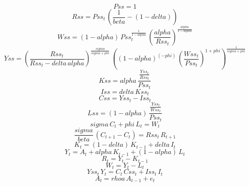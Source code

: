 \begin{dmath*}
Pss = 1
\end{dmath*}
\begin{dmath*}
Rss = {Pss}_{t}\, \left(\frac{1}{{beta}}-\left(1-{delta}\right)\right)
\end{dmath*}
\begin{dmath*}
Wss = \left(1-{alpha}\right)\, {Pss}_{t}^{\frac{1}{1-{alpha}}}\, \left(\frac{{alpha}}{{Rss}_{t}}\right)^{\frac{{alpha}}{1-{alpha}}}
\end{dmath*}
\begin{dmath*}
Yss = \left(\frac{{Rss}_{t}}{{Rss}_{t}-{delta}\, {alpha}}\right)^{\frac{{sigma}}{{sigma}+{phi}}}\, \left(\left(1-{alpha}\right)^{\left(-{phi}\right)}\, \left(\frac{{Wss}_{t}}{{Pss}_{t}}\right)^{1+{phi}}\right)^{\frac{1}{{sigma}+{phi}}}
\end{dmath*}
\begin{dmath*}
Kss = {alpha}\, \frac{\frac{{Yss}_{t}}{{Rss}_{t}}}{{Pss}_{t}}
\end{dmath*}
\begin{dmath*}
Iss = {delta}\, {Kss}_{t}
\end{dmath*}
\begin{dmath*}
Css = {Yss}_{t}-{Iss}_{t}
\end{dmath*}
\begin{dmath*}
Lss = \left(1-{alpha}\right)\, \frac{\frac{{Yss}_{t}}{{Wss}_{t}}}{{Pss}_{t}}
\end{dmath*}
\begin{dmath}
{sigma}\, {{C}}_{t}+{phi}\, {{L}}_{t}={{W}}_{t}
\end{dmath}
\begin{dmath}
\frac{{sigma}}{{beta}}\, \left({{C}}_{t+1}-{{C}}_{t}\right)={Rss}_{t}\, {{R}}_{t+1}
\end{dmath}
\begin{dmath}
{{K}}_{t}=\left(1-{delta}\right)\, {{K}}_{t-1}+{delta}\, {{I}}_{t}
\end{dmath}
\begin{dmath}
{{Y}}_{t}={{A}}_{t}+{alpha}\, {{K}}_{t-1}+\left(1-{alpha}\right)\, {{L}}_{t}
\end{dmath}
\begin{dmath}
{{R}}_{t}={{Y}}_{t}-{{K}}_{t-1}
\end{dmath}
\begin{dmath}
{{W}}_{t}={{Y}}_{t}-{{L}}_{t}
\end{dmath}
\begin{dmath}
{Yss}_{t}\, {{Y}}_{t}={{C}}_{t}\, {Css}_{t}+{Iss}_{t}\, {{I}}_{t}
\end{dmath}
\begin{dmath}
{{A}}_{t}={rhoa}\, {{A}}_{t-1}+{e}_{t}
\end{dmath}
